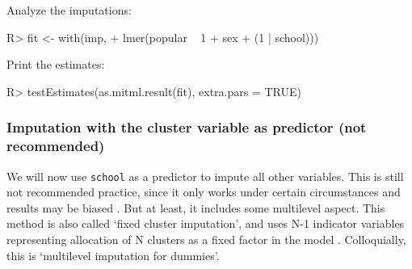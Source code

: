 \documentclass[
]{jss}
\begin{document}
Analyze the imputations:

\begin{CodeChunk}
\begin{CodeInput}
R> fit <- with(imp, 
+             lmer(popular ~ 1 + sex  + (1 | school))) 
\end{CodeInput}
\end{CodeChunk}

Print the estimates:

\begin{CodeChunk}
\begin{CodeInput}
R> testEstimates(as.mitml.result(fit), extra.pars = TRUE)
\end{CodeInput}
\end{CodeChunk}

\hypertarget{imputation-with-the-cluster-variable-as-predictor-not-recommended}{%
\subsubsection{Imputation with the cluster variable as predictor (not
recommended)}\label{imputation-with-the-cluster-variable-as-predictor-not-recommended}}

We will now use \texttt{school} as a predictor to impute all other
variables. This is still not recommended practice, since it only works
under certain circumstances and results may be biased
\citep{drec15, ende16}. But at least, it includes some multilevel
aspect. This method is also called `fixed cluster imputation', and uses
N-1 indicator variables representing allocation of N clusters as a fixed
factor in the model \citep{reit06, ende16}. Colloquially, this is
`multilevel imputation for dummies'.
\end{document}

